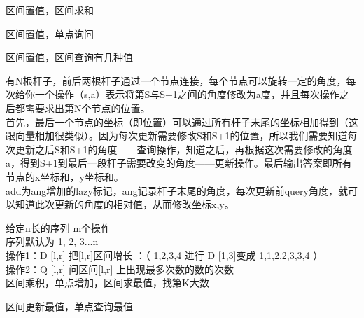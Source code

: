 区间置值，区间求和

%
区间置值，单点询问

区间置值，区间查询有几种值

有N根杆子，前后两根杆子通过一个节点连接，每个节点可以旋转一定的角度，每次给你一个操作（s,a）表示将第S与S+1之间的角度修改为a度，并且每次操作之后都需要求出第N个节点的位置。\\
首先，最后一个节点的坐标（即位置）可以通过所有杆子末尾的坐标相加得到（这跟向量相加很类似）。因为每次更新需要修改S和S+1的位置，所以我们需要知道每次更新之后S和S+1的角度——查询操作，知道之后，再根据这次需要修改的角度a，得到S+1到最后一段杆子需要改变的角度——更新操作。最后输出答案即所有节点的x坐标和，y坐标和。\\
add为ang增加的lazy标记，ang记录杆子末尾的角度，每次更新前query角度，就可以知道此次更新的角度的相对值，从而修改坐标x,y。

给定n长的序列 m个操作\\
序列默认为 1, 2, 3...n\\
操作1：D [l,r] 把[l,r]区间增长 ：（ 1,2,3,4 进行 D [1,3]变成 1,1,2,2,3,3,4 ）\\
操作2：Q [l,r] 问区间[l,r] 上出现最多次数的数的次数\\
区间乘积，单点增加，区间求最值，找第K大数

区间更新最值，单点查询最值

